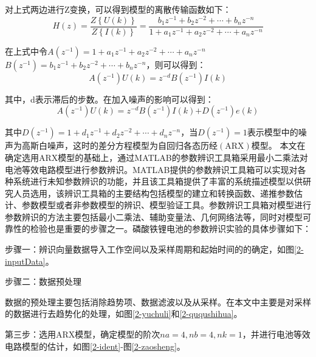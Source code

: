 对上式两边进行Z变换，可以得到模型的离散传输函数如下：
\begin{equation}
H\left( z \right)=\frac{Z\left\{ U\left( k \right) \right\}}{Z\left\{ I\left( k \right) \right\}}=\frac{{{b}_{1}}{{z}^{-1}}+{{b}_{2}}{{z}^{-2}}+\cdots +{{b}_{n}}{{z}^{-n}}}{1+{{a}_{1}}{{z}^{-1}}+{{a}_{2}}{{z}^{-2}}+\cdots +{{a}_{n}}{{z}^{-n}}}
\end{equation}

在上式中令$A\left( {{z}^{-1}} \right)=1+{{a}_{1}}z{}^{-1}+{{a}_{2}}{{z}^{-2}}+\cdots +{{a}_{n}}{{z}^{-n}}$~$B\left( {{z}^{-1}} \right)={{b}_{1}}{{z}^{-1}}+{{b}_{2}}{{z}^{-2}}+\cdots +{{b}_{n}}{{z}^{-n}}$，则可以得到：
\begin{equation}
A\left( {{z}^{-1}} \right)U\left( k \right)={{z}^{-d}}B\left( {{z}^{-1}} \right)I\left( k \right)
\end{equation}

其中，d表示滞后的步数。在加入噪声的影响可以得到：
\begin{equation}
A\left( {{z}^{-1}} \right)U\left( k \right)={{z}^{-d}}B\left( {{z}^{-1}} \right)I\left( k \right)\text{+}D\left( {{z}^{-1}} \right)e\left( k \right)
\end{equation}

其中$D\left( {{z}^{-1}} \right)=1+{{d}_{1}}{{z}^{-1}}+{{d}_{2}}{{z}^{-2}}+\cdots +{{d}_{n}}{{z}^{-n}}$，当$D\left( {{z}^{-1}} \right)=1$表示模型中的噪声为高斯白噪声，这时的差分方程模型为自回归各态历经$\left( \text{ARX} \right)$模型。
	本文在确定选用ARX模型的基础上，通过MATLAB的参数辨识工具箱采用最小二乘法对电池等效电路模型进行参数辨识。MATLAB提供的参数辨识工具箱可以实现对各种系统进行未知参数辨识的功能，并且该工具箱提供了丰富的系统描述模型以供研究人员选用，该辨识工具箱的主要结构包括模型的建立和转换函数、递推参数估计、参数模型或者非参数模型的辨识、模型验证工具。参数辨识工具箱对模型进行参数辨识的方法主要包括最小二乘法、辅助变量法、几何网络法等，同时对模型可靠性的检验也是重要的步骤之一。磷酸铁锂电池的参数辨识实验的具体步骤如下：

步骤一：辨识向量数据导入工作空间以及采样周期和起始时间的的确定，如图\ref{2-inputData}。

步骤二：数据预处理

数据的预处理主要包括消除趋势项、数据滤波以及从采样。在本文中主要是对采样的数据进行去趋势化的处理，如图\ref{2-yuchuli}和\ref{2-ququshihua}。

第三步：选用ARX模型，确定模型的阶次$na=4,nb=4,nk=1$，并进行电池等效电路模型的估计，如图\ref{2-ident}-图\ref{2-zaosheng}。

